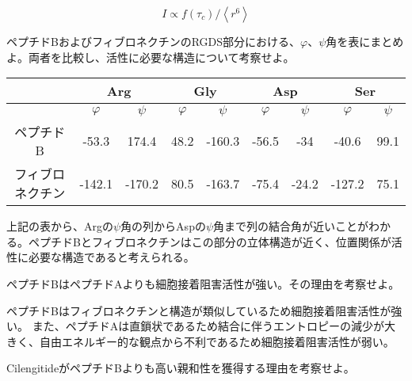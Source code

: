 \documentclass[a4paper,papersize,dvipdfmx]{jsarticle}
\begin{document}
\[I   \propto f(\tau _c )/ \left<r^6\right>\]


\begin{tcolorbox}[colback=white,colbacktitle=black!10!white,coltitle=black,title={3}]
ペプチドBおよびフィブロネクチンのRGDS部分における、$\varphi$、$\psi$角を表にまとめよ。両者を比較し、活性に必要な構造について考察せよ。
\end{tcolorbox}

\begin{table}[H]
\begin{center}
\begin{tabular}{|c|c|c|c|c|c|c|c|c|}
\hline
& \multicolumn{2}{c|}{Arg} & \multicolumn{2}{c|}{Gly} & \multicolumn{2}{c|}{Asp} & \multicolumn{2}{c|}{Ser} \\ \hline
& $\varphi$           & $\psi$         &  $\varphi$          & $\psi$           &  $\varphi$           & $\psi$          &  $\varphi$            & $\psi$         \\ \hline
ペプチドB    & -53.3       & 174.4      & 48.2       & -160.3      & -56.5       & -34        & -40.6        & 99.1      \\ \hline
フィブロネクチン & -142.1      & -170.2     & 80.5       & -163.7      & -75.4       & -24.2      & -127.2       & 75.1      \\ \hline
\end{tabular}
\end{center}
\end{table}

上記の表から、Argの$\psi$角の列からAspの$\psi$角まで列の結合角が近いことがわかる。ペプチドBとフィブロネクチンはこの部分の立体構造が近く、位置関係が活性に必要な構造であると考えられる。


\begin{tcolorbox}[colback=white,colbacktitle=black!10!white,coltitle=black,title={4}]
ペプチドBはペプチドAよりも細胞接着阻害活性が強い。その理由を考察せよ。
\end{tcolorbox}

ペプチドBはフィブロネクチンと構造が類似しているため細胞接着阻害活性が強い。
また、ペプチドAは直鎖状であるため結合に伴うエントロピーの減少が大きく、自由エネルギー的な観点から不利であるため細胞接着阻害活性が弱い。


\begin{tcolorbox}[colback=white,colbacktitle=black!10!white,coltitle=black,title={5}]
CilengitideがペプチドBよりも高い親和性を獲得する理由を考察せよ。
\end{tcolorbox}
\end{document}

